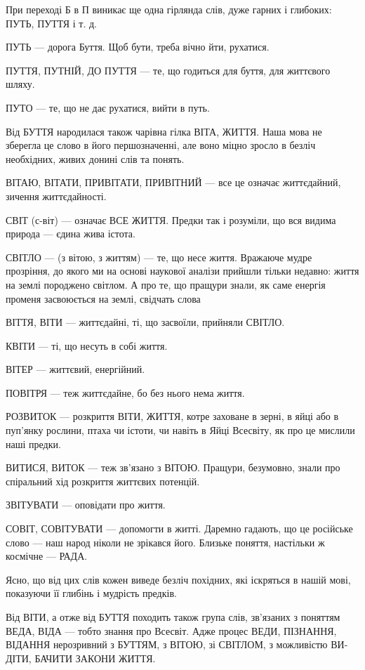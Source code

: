 При переході Б в П виникає ще одна гірлянда слів, дуже гарних і глибоких: ПУТЬ,
ПУТТЯ і т. д.

ПУТЬ — дорога Буття. Щоб бути, треба вічно йти, рухатися.

ПУТТЯ, ПУТНІЙ, ДО ПУТТЯ — те, що годиться для буття, для життєвого шляху.

ПУТО — те, що не дає рухатися, вийти в путь.

Від БУТТЯ народилася також чарівна гілка ВІТА, ЖИТТЯ. Наша мова не зберегла це
слово в його першозначенні, але воно міцно зросло в безліч необхідних, живих
донині слів та понять.

ВІТАЮ, ВІТАТИ, ПРИВІТАТИ, ПРИВІТНИЙ — все це означає життєдайний, зичення
життєдайності.

СВІТ (с-віт) — означає ВСЕ ЖИТТЯ. Предки так і розуміли, що вся видима природа
— єдина жива істота.

СВІТЛО — (з вітою, з життям) — те, що несе життя. Вражаюче мудре прозріння, до
якого ми на основі наукової аналізи прийшли тільки недавно: життя на землі
породжено світлом. А про те, що пращури знали, як саме енергія променя
засвоюється на землі, свідчать слова

ВІТТЯ, ВІТИ — життєдайні, ті, що засвоїли, прийняли СВІТЛО.

КВІТИ — ті, що несуть в собі життя.

ВІТЕР — життєвий, енергійний.

ПОВІТРЯ — теж життєдайне, бо без нього нема життя.

РОЗВИТОК — розкриття ВІТИ, ЖИТТЯ, котре заховане в зерні, в яйці або в пуп’янку
рослини, птаха чи істоти, чи навіть в Яйці Всесвіту, як про це мислили наші
предки.

ВИТИСЯ, ВИТОК — теж зв’язано з ВІТОЮ. Пращури, безумовно, знали про спіральний
хід розкриття життєвих потенцій.

ЗВІТУВАТИ — оповідати про життя.

СОВІТ, СОВІТУВАТИ — допомогти в житті. Даремно гадають, що це російське слово —
наш народ ніколи не зрікався його. Близьке поняття, настільки ж космічне —
РАДА.

Ясно, що від цих слів кожен виведе безліч похідних, які іскряться в нашій мові,
показуючи її глибінь і мудрість предків.

Від ВІТИ, а отже від БУТТЯ походить також група слів, зв’язаних з поняттям
ВЕДА, ВІДА — тобто знання про Всесвіт. Адже процес ВЕДИ, ПІЗНАННЯ, ВІДАННЯ
нерозривний з БУТТЯМ, з ВІТОЮ, зі СВІТЛОМ, з можливістю ВИ-ДІТИ, БАЧИТИ ЗАКОНИ
ЖИТТЯ.

